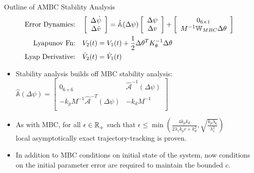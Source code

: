 \begin{frame}[t]{Outline of AMBC Stability Analysis}
\begin{align}
\text{Error Dynamics:}\quad &\left[ \begin{array}{c}
     \Delta \dot{\psi}           \\
     \Delta \dot{v}              \\
\end{array} \right]=\hat{\mathbb{A}}(\Delta \psi)
\left[ \begin{array}{c}
     \Delta \psi           \\
     \Delta v              \\
\end{array} \right]+
\left[\begin{array}{c}
   0_{6\times 1}   \\ M^{-1}\mathbb{W}_{MBC} \Delta \theta
   \end{array} \right] 
\nonumber \\
\text{Lyapunov Fn:}\quad & 
V_2(t)=V_1(t)+ \frac{1}{2}\Delta\theta^T K_\theta^{-1} \Delta \theta
\nonumber \\
\text{Lyap Derivative:}\quad & \dot{V}_2(t) =\dot{V}_1(t)
\nonumber
\end{align}

\begin{itemize}
\item  Stability analysis builds off MBC stability analysis: $\hat{\mathbb{A}}(\Delta \psi)=\left[ \begin{array}{cc}
     0_{6\times 6}   & \hat{\mathcal{A}}^{-1}(\Delta \psi)             \\
     -k_p M^{-1}\hat{\mathcal{A}}^{-T}(\Delta \psi)   &  -k_d M^{-1}   \\
\end{array} \right]$
\pause
\item As with MBC, for all $\epsilon\in\mathbb{R}^{}_+$ such that $\epsilon\leq\min\left(\frac{4 k_p k_d}{2 \lambda_1 k_p c
    +k_d^2},\sqrt{\frac{k_p \lambda_6}{\lambda_1^{2}}} \right)$ \\ local asymptotically exact trajectory-tracking is proven.
\item In addition to MBC conditions on initial state of the system, now conditions on the initial parameter error
      are required to maintain the bounded $c$.
\end{itemize}
\end{frame}

